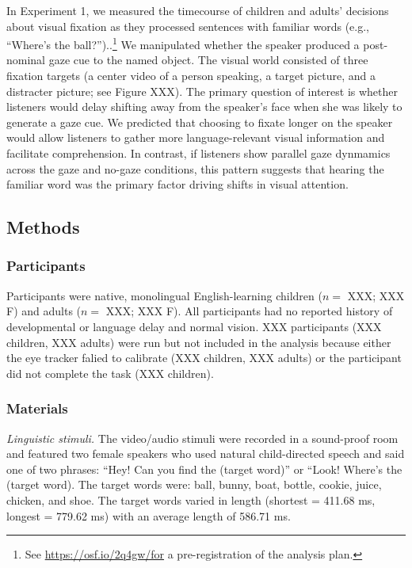 \documentclass[man,floatsintext]{apa6}
\let\rmarkdownfootnote\footnote%
\def\footnote{\protect\rmarkdownfootnote}
\theoremstyle{definition}
\theoremstyle{definition}
\theoremstyle{definition}
\theoremstyle{remark}
\begin{document}
In Experiment 1, we measured the timecourse of children and adults'
decisions about visual fixation as they processed sentences with
familiar words (e.g., \enquote{Where's the ball?})..\footnote{See
  \url{https://osf.io/2q4gw/for} a pre-registration of the analysis
  plan.} We manipulated whether the speaker produced a post-nominal gaze
cue to the named object. The visual world consisted of three fixation
targets (a center video of a person speaking, a target picture, and a
distracter picture; see Figure XXX). The primary question of interest is
whether listeners would delay shifting away from the speaker's face when
she was likely to generate a gaze cue. We predicted that choosing to
fixate longer on the speaker would allow listeners to gather more
language-relevant visual information and facilitate comprehension. In
contrast, if listeners show parallel gaze dynmamics across the gaze and
no-gaze conditions, this pattern suggests that hearing the familiar word
was the primary factor driving shifts in visual attention.

\subsection{Methods}\label{methods}

\subsubsection{Participants}\label{participants}

Participants were native, monolingual English-learning children (\(n=\)
XXX; XXX F) and adults (\(n=\) XXX; XXX F). All participants had no
reported history of developmental or language delay and normal vision.
XXX participants (XXX children, XXX adults) were run but not included in
the analysis because either the eye tracker falied to calibrate (XXX
children, XXX adults) or the participant did not complete the task (XXX
children).

\subsubsection{Materials}\label{materials}

\emph{Linguistic stimuli.} The video/audio stimuli were recorded in a
sound-proof room and featured two female speakers who used natural
child-directed speech and said one of two phrases: \enquote{Hey! Can you
find the (target word)} or ``Look! Where's the (target word). The target
words were: ball, bunny, boat, bottle, cookie, juice, chicken, and shoe.
The target words varied in length (shortest = 411.68 ms, longest =
779.62 ms) with an average length of 586.71 ms.
\end{document}
